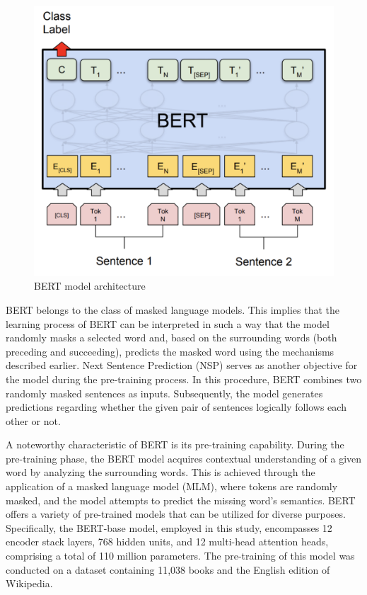 \begin{figure}[hbt!]
\centering
\includegraphics[width=0.75\linewidth]{bert_architecture.png}
\caption{BERT model architecture \autocite{Devlin2018}}
\label{bert_architecture}
\end{figure}

BERT belongs to the class of masked language models. This implies that the learning process of BERT can be interpreted in such a way that the model randomly masks a selected word and, based on the surrounding words (both preceding and succeeding), predicts the masked word using the mechanisms described earlier. 
Next Sentence Prediction (NSP) serves as another objective for the model during the pre-training process. In this procedure, BERT combines two randomly masked sentences as inputs. Subsequently, the model generates predictions regarding whether the given pair of sentences logically follows each other or not.

A noteworthy characteristic of BERT is its pre-training capability. During the pre-training phase, the BERT model acquires contextual understanding of a given word by analyzing the surrounding words. This is achieved through the application of a masked language model (MLM), where tokens are randomly masked, and the model attempts to predict the missing word's semantics. BERT offers a variety of pre-trained models that can be utilized for diverse purposes. Specifically, the BERT-base model, employed in this study, encompasses 12 encoder stack layers, 768 hidden units, and 12 multi-head attention heads, comprising a total of 110 million parameters. The pre-training of this model was conducted on a dataset containing 11,038 books and the English edition of Wikipedia.


